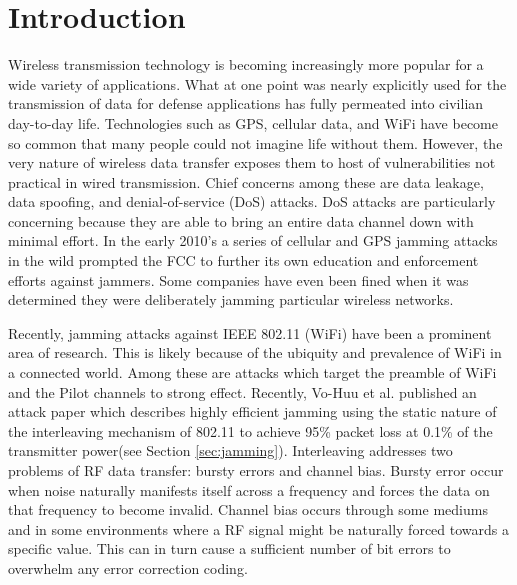 \documentclass[sigconf]{acmart}
\begin{document}


\maketitle

\section{Introduction}

Wireless transmission technology is becoming increasingly more popular for a wide variety of applications. What at one point was nearly explicitly used for the transmission of data for defense applications has fully permeated into civilian day-to-day life. Technologies such as GPS, cellular data, and WiFi have become so common that many people could not imagine life without them. However, the very nature of wireless data transfer exposes them to host of vulnerabilities not practical in wired transmission. Chief concerns among these are data leakage, data spoofing, and denial-of-service (DoS) attacks. DoS attacks are particularly concerning because they are able to bring an entire data channel down with minimal effort. In the early 2010's a series of cellular and GPS jamming attacks in the wild prompted the FCC to further its own education and enforcement efforts against jammers\cite{FCC2011enforcement}. Some companies have even been fined when it was determined they were deliberately jamming particular wireless networks\cite{FCC2014marriott}.

Recently, jamming attacks against IEEE 802.11 (WiFi) have been a prominent area of research. This is likely because of the ubiquity and prevalence of WiFi in a connected world. Among these are attacks which target the preamble of WiFi and the Pilot channels to strong effect. Recently, Vo-Huu et al. published an attack paper which describes highly efficient jamming using the static nature of the interleaving mechanism of 802.11 to achieve 95\% packet loss at 0.1\% of the transmitter power(see Section \ref{sec:jamming})\cite{vo2016interleaving}. Interleaving addresses two problems of RF data transfer: bursty errors and channel bias. Bursty error occur when noise naturally manifests itself across a frequency and forces the data on that frequency to become invalid. Channel bias occurs through some mediums and in some environments where a RF signal might be naturally forced towards a specific value. This can in turn cause a sufficient number of bit errors to overwhelm any error correction coding.
\end{document}
